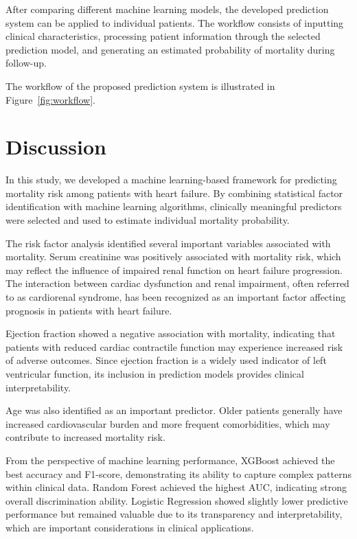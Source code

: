 \documentclass[11pt]{article}
\begin{document}
After comparing different machine learning models, the developed prediction
system can be applied to individual patients. The workflow consists of
inputting clinical characteristics, processing patient information through the
selected prediction model, and generating an estimated probability of mortality
during follow-up.

The workflow of the proposed prediction system is illustrated in
Figure~\ref{fig:workflow}.



\section{Discussion}


In this study, we developed a machine learning-based framework for predicting
mortality risk among patients with heart failure. By combining statistical
factor identification with machine learning algorithms, clinically meaningful
predictors were selected and used to estimate individual mortality probability.


The risk factor analysis identified several important variables associated with
mortality. Serum creatinine was positively associated with mortality risk,
which may reflect the influence of impaired renal function on heart failure
progression. The interaction between cardiac dysfunction and renal impairment,
often referred to as cardiorenal syndrome, has been recognized as an important
factor affecting prognosis in patients with heart failure.


Ejection fraction showed a negative association with mortality, indicating that
patients with reduced cardiac contractile function may experience increased
risk of adverse outcomes. Since ejection fraction is a widely used indicator of
left ventricular function, its inclusion in prediction models provides clinical
interpretability.


Age was also identified as an important predictor. Older patients generally
have increased cardiovascular burden and more frequent comorbidities, which may
contribute to increased mortality risk.


From the perspective of machine learning performance, XGBoost achieved the best
accuracy and F1-score, demonstrating its ability to capture complex patterns
within clinical data. Random Forest achieved the highest AUC, indicating strong
overall discrimination ability. Logistic Regression showed slightly lower
predictive performance but remained valuable due to its transparency and
interpretability, which are important considerations in clinical applications.
\end{document}
